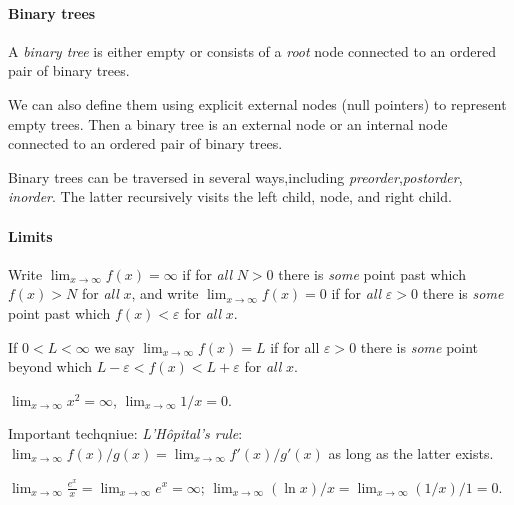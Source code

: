 \paragraph{Binary trees}

A \emph{binary tree} is either empty or consists of a \emph{root} node connected to an ordered pair of binary trees. 
 
We can also define them using explicit external nodes (null pointers) to represent empty trees. Then a binary tree is an external node or an internal node connected to an ordered pair of binary trees.
 
Binary trees can be traversed in several ways,including \emph{preorder},\emph{postorder}, \emph{inorder}. The latter recursively visits the left child, node, and right child.

\paragraph{Limits}

Write $\lim_{x\to \infty} f(x) = \infty$ if for \emph{all} $N>0$ there is \emph{some} point past which $f(x) > N$ for \emph{all} $x$, and write $\lim_{x\to\infty} f(x) = 0$ if for \emph{all} $\varepsilon>0$ there is \emph{some} point past which $f(x) < \varepsilon$ for \emph{all} $x$.

If $0 < L < \infty$ we say $\lim_{x\to\infty} f(x) = L$ if for all $\varepsilon > 0$ there is \emph{some} point beyond which $L - \varepsilon < f(x) < L + \varepsilon$ for \emph{all} $x$.

\begin{Example}
$\lim_{x\to\infty} x^2 = \infty$, $\lim_{x\to \infty} 1/x = 0$.
\end{Example}

Important techqniue: \emph{L'H\^{o}pital's rule}: $\lim_{x\to \infty} f(x)/g(x) = \lim_{x\to \infty} f'(x)/g'(x)$ as long as the latter exists. 

\begin{Example}
 $\lim_{x\to\infty} \frac{e^x}{x} = \lim_{x\to\infty} e^x = \infty$; $\lim_{x\to\infty} (\ln x)/x = \lim_{x\to\infty} (1/x)/1 = 0$.
 \end{Example}



